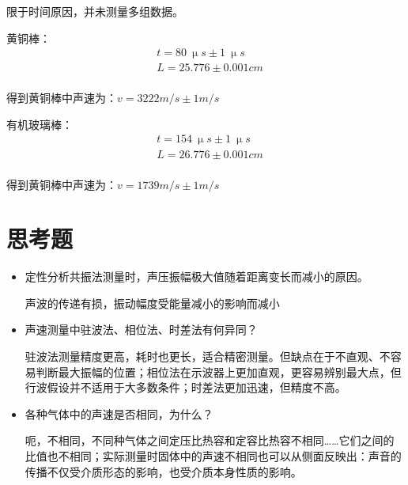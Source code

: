 \documentclass[a4paper]{ltxdoc}
\begin{document}
\begin{multicols}{2}
    限于时间原因，并未测量多组数据。

    \smallskip
    黄铜棒：
    $$
        \begin{aligned}
             & t = 80\ \upmu s \pm 1\ \upmu s \\
             & L = 25.776 \pm 0.001 cm        \\
        \end{aligned}
    $$

    得到黄铜棒中声速为：$v= 3222 m/s \pm 1 m/s$

    \smallskip
    有机玻璃棒：
    $$
        \begin{aligned}
             & t = 154\ \upmu s \pm 1\ \upmu s \\
             & L = 26.776 \pm 0.001 cm         \\
        \end{aligned}
    $$

    得到黄铜棒中声速为：$v= 1739 m/s \pm 1 m/s$

    \section{思考题}
    \begin{itemize}
        \item 定性分析共振法测量时，声压振幅极大值随着距离变长而减小的原因。

              声波的传递有损，振动幅度受能量减小的影响而减小
        \item 声速测量中驻波法、相位法、时差法有何异同？

              驻波法测量精度更高，耗时也更长，适合精密测量。但缺点在于不直观、不容易判断最大振幅的位置；相位法在示波器上更加直观，更容易辨别最大点，但行波假设并不适用于大多数条件；时差法更加迅速，但精度不高。
        \item 各种气体中的声速是否相同，为什么？

              呃，不相同，不同种气体之间定压比热容和定容比热容不相同……它们之间的比值也不相同；实际测量时固体中的声速不相同也可以从侧面反映出：声音的传播不仅受介质形态的影响，也受介质本身性质的影响。
    \end{itemize}
\end{multicols}
\end{document}
